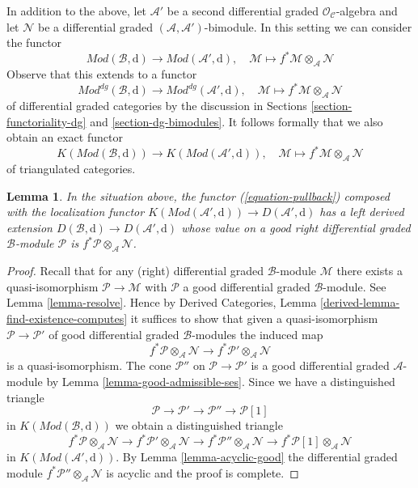 \documentclass{stacks-project}
\theoremstyle{plain}
\newtheorem{lemma}[subsection]{Lemma}
\theoremstyle{definition}
\theoremstyle{remark}
\numberwithin{equation}{subsection}
\begin{document}
\medskip\noindent
In addition to the above, let $\mathcal{A}'$ be a second differential
graded $\mathcal{O}_\mathcal{C}$-algebra and let $\mathcal{N}$
be a differential graded $(\mathcal{A}, \mathcal{A}')$-bimodule.
In this setting we can consider the functor
$$
\textit{Mod}(\mathcal{B}, \text{d})
\longrightarrow
\textit{Mod}(\mathcal{A}', \text{d}),\quad
\mathcal{M} \longmapsto f^*\mathcal{M} \otimes_{\mathcal{A}} \mathcal{N}
$$
Observe that this extends to a functor
$$
\textit{Mod}^{dg}(\mathcal{B}, \text{d})
\longrightarrow
\textit{Mod}^{dg}(\mathcal{A}', \text{d}),\quad
\mathcal{M} \longmapsto f^*\mathcal{M} \otimes_{\mathcal{A}} \mathcal{N}
$$
of differential graded categories by the discussion in
Sections \ref{section-functoriality-dg} and \ref{section-dg-bimodules}.
It follows formally that we also obtain an exact functor
\begin{equation}
\label{equation-pullback}
K(\textit{Mod}(\mathcal{B}, \text{d}))
\longrightarrow
K(\textit{Mod}(\mathcal{A}', \text{d})),\quad
\mathcal{M} \longmapsto f^*\mathcal{M} \otimes_{\mathcal{A}} \mathcal{N}
\end{equation}
of triangulated categories.

\begin{lemma}
\label{lemma-derived-tensor-product}
In the situation above, the functor (\ref{equation-pullback})
composed with the localization functor
$K(\textit{Mod}(\mathcal{A}', \text{d})) \to D(\mathcal{A}', \text{d})$
has a left derived extension
$D(\mathcal{B}, \text{d}) \to D(\mathcal{A}', \text{d})$ whose
value on a good right differential graded $\mathcal{B}$-module
$\mathcal{P}$ is $f^*\mathcal{P} \otimes_\mathcal{A} \mathcal{N}$.
\end{lemma}

\begin{proof}
Recall that for any (right) differential graded $\mathcal{B}$-module
$\mathcal{M}$ there exists a quasi-isomorphism $\mathcal{P} \to \mathcal{M}$
with $\mathcal{P}$ a good differential graded $\mathcal{B}$-module.
See Lemma \ref{lemma-resolve}.
Hence by Derived Categories, Lemma \ref{derived-lemma-find-existence-computes}
it suffices to show that given a quasi-isomorphism
$\mathcal{P} \to \mathcal{P}'$ of good differential graded
$\mathcal{B}$-modules the induced map
$$
f^*\mathcal{P} \otimes_\mathcal{A} \mathcal{N}
\longrightarrow
f^*\mathcal{P}' \otimes_\mathcal{A} \mathcal{N}
$$
is a quasi-isomorphism. The cone $\mathcal{P}''$ on
$\mathcal{P} \to \mathcal{P}'$ is a good differential graded
$\mathcal{A}$-module by Lemma \ref{lemma-good-admissible-ses}.
Since we have a distinguished triangle
$$
\mathcal{P} \to \mathcal{P}' \to \mathcal{P}'' \to \mathcal{P}[1]
$$
in $K(\textit{Mod}(\mathcal{B}, \text{d}))$ we obtain a distinguished
triangle
$$
f^*\mathcal{P} \otimes_\mathcal{A} \mathcal{N} \to
f^*\mathcal{P}' \otimes_\mathcal{A} \mathcal{N} \to
f^*\mathcal{P}'' \otimes_\mathcal{A} \mathcal{N} \to
f^*\mathcal{P}[1] \otimes_\mathcal{A} \mathcal{N}
$$
in $K(\textit{Mod}(\mathcal{A}', \text{d}))$. By
Lemma \ref{lemma-acyclic-good}
the differential graded module
$f^*\mathcal{P}'' \otimes_\mathcal{A} \mathcal{N}$
is acyclic and the proof is complete.
\end{proof}
\end{document}
